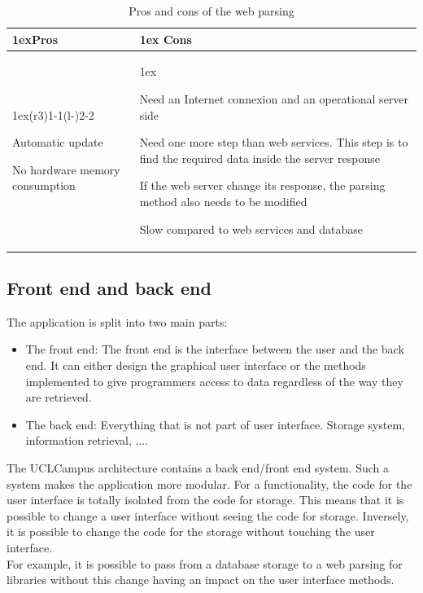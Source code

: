 \documentclass{eplmastersthesis}
\begin{document}
\begin{table}[H]
\begin{tabularx}{\linewidth}{>{\parskip1ex}X@{\kern4\tabcolsep}>{\parskip1ex}X}
\toprule
\hfil\bfseries Pros
&
\hfil\bfseries Cons
\\\cmidrule(r{3\tabcolsep}){1-1}\cmidrule(l{-\tabcolsep}){2-2}

Automatic update\par
No hardware memory consumption\par

&

Need an Internet connexion and an operational server side\par
Need one more step than web services. This step is to find the required data inside the server response\par
If the web server change its response, the parsing method also needs to be modified\par
Slow compared to web services and database\par


\\\bottomrule
\end{tabularx}
\caption{Pros and cons of the web parsing}
\end{table}

\newpage
\subsection{Front end and back end}

The application is split into two main parts:
\begin{itemize}
\item The front end: The front end is the interface between the user and the back end. It can either design the graphical user interface or the methods implemented to give programmers access to data regardless of the way they are retrieved.
\item The back end: Everything that is not part of user interface. Storage system, information retrieval, ....
\end{itemize}

The UCLCampus architecture contains a back end/front end system. Such a system makes the application more modular. For a functionality, the code for the user interface is totally isolated from the code for storage. This means that it is possible to change a user interface without seeing the code for storage. Inversely, it is possible to change the code for the storage without touching the user interface.\\
For example, it is possible to pass from a database storage to a web parsing for libraries without this change having an impact on the user interface methods.
\end{document}
